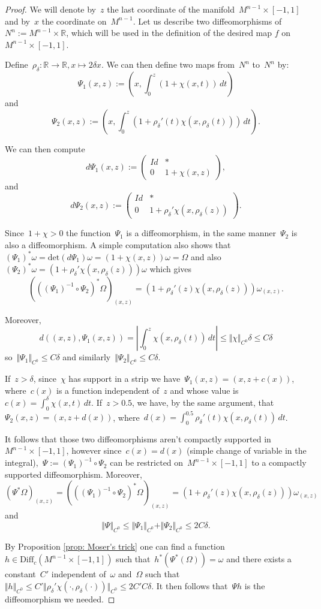 \documentclass[10pt,a4paper]{amsart}
\begin{document}
\begin{proof}
We will denote by~$z$ the last coordinate of the manifold~$M^{n-1}\times [-1,1]$ and by~$x$ the coordinate on~$M^{n-1}$. Let us describe two diffeomorphisms of~$N^n:=M^{n-1}\times \mathbb{R}$, which will be used in the definition of the desired map $f$ on~$M^{n-1}\times [-1,1]$.

Define~$\rho_\delta: \mathbb{R}\rightarrow \mathbb{R}, x\mapsto 2\delta x$. We can then define two maps from~$N^n$ to~$N^n$ by:
$$\Psi_1(x,z):=\left(x,\int_0^z(1+\chi(x,t))\,dt\right)$$
and 
$$\Psi_2(x,z):=\left(x,\int_0^z(1+\rho_\delta'(t)\chi(x,\rho_\delta(t)))\,dt\right).$$

We can then compute 
$$d\Psi_1(x,z):=\begin{pmatrix}
	Id & *\\
	0 &  1+\chi(x,z)
\end{pmatrix},$$
and
$$d\Psi_2(x,z):=\begin{pmatrix}
	Id & *\\
	0 &  1+\rho_\delta'\chi(x,\rho_\delta(z))
\end{pmatrix}.$$

Since~$1+\chi>0$ the function~$\Psi_1$ is a diffeomorphism, in the same manner~$\Psi_2$ is also a diffeomorphism. A simple computation also shows that~$(\Psi_{1})^*\omega=\text{det}(d \Psi_1)\omega=(1+\chi(x,z))\omega=\Omega$ and also~$(\Psi_{2})^*\omega=(1+\rho_\delta'\chi(x,\rho_\delta(z)))\omega$ which gives 
$$\left(((\Psi_1)^{-1} \circ \Psi_2)^*\Omega\right)_{(x,z)}=(1+\rho_\delta'(z)\chi(x,\rho_\delta(z)))\omega_{(x,z)}.$$

Moreover, 
$$d\left((x,z),\Psi_1(x,z)\right)=\left\vert\int_0^z \chi(x,\rho_\delta(t))\,dt\right\vert \leq \Vert \chi \Vert_{C^0} \delta\leq C \delta$$
so~$\Vert \Psi_1 \Vert_{C^0}\leq C\delta$ and similarly~$\Vert \Psi_2 \Vert_{C^0}\leq C \delta$.

If~$z>\delta$, since~$\chi$ has support in a strip we have~$\Psi_1(x,z)=(x,z+c(x))$, where~$c(x)$ is a function independent of~$z$ and whose value is~$c(x)=\int_0^\delta \chi(x,t)\, dt$. If~$z>0.5$, we have, by the same argument, that~$\Psi_2(x,z)=(x,z+d(x))$, where~$d(x)=\int_0^{0.5}\rho_\delta'(t)\chi(x,\rho_\delta(t))\, dt$. 

It follows that those two diffeomorphisms aren't compactly supported in~$M^{n-1}\times [-1,1]$, however since~$c(x)=d(x)$ (simple change of variable in the integral),~$\Psi:=(\Psi_1)^{-1} \circ \Psi_2$ can be restricted on~$M^{n-1}\times [-1,1]$ to a compactly supported diffeomorphism. Moreover,~$$\left(\Psi^*\Omega\right)_{(x,z)}=\left(((\Psi_1)^{-1} \circ \Psi_2)^*\Omega\right)_{(x,z)}=(1+\rho_\delta'(z)\chi(x,\rho_\delta(z)))\omega_{(x,z)}$$ and 
$$\Vert\Psi\Vert_{C^0}\leq \Vert \Psi_1\Vert_{C^0}+\Vert \Psi_2\Vert_{C^0}\leq 2C\delta.$$

By Proposition \ref{prop: Moser's trick} one can find a function~$h\in \text{Diff}_c(M^{n-1}\times[-1,1])$ such that~$h^*(\Psi^*(\Omega))=\omega$ and there exists a constant~$C'$ independent of~$\omega$ and~$\Omega$ such that~$\Vert h \Vert_{C^0}\leq C' \Vert \rho_\delta' \chi(\cdot,\rho_\delta(\cdot))\Vert_{C^0}\leq 2C'C\delta$. It then follows that~$\Psi h$ is the diffeomorphism we needed.

\end{proof}
\end{document}
